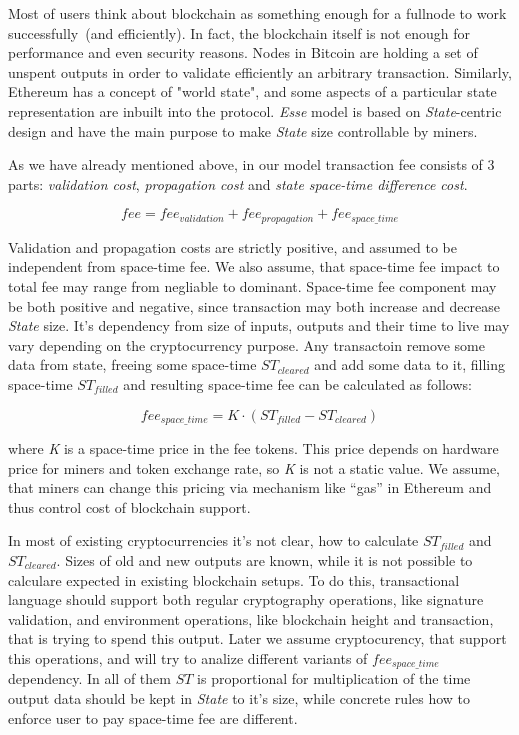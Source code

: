 \documentclass[]{article}   %
\newcommand{\authnote}[2]{\marginpar{\parbox{\marginparwidth}{\tiny %
  \textsf{#1 {\textcolor{blue}{notes: #2}}}}}%
  \textcolor{blue}{\textbf{\dag}}}
\newcommand{\authnote}[2]{
  \textsf{#1 \textcolor{blue}{: #2}}}
\newcommand{\authnote}[2]{}
\newcommand{\dnote}[1]{{\authnote{\textcolor{blue}{Dima notes}}{#1}}}
\newcommand{\esse}{\textit{Esse}}
\newcommand{\state}{\textit{State}}
\begin{document}
Most of users think about blockchain as something enough for a fullnode to work successfully~(and efficiently). In fact, the blockchain itself is not enough for performance and even security reasons. Nodes in Bitcoin are holding a set of unspent outputs in order to validate efficiently an arbitrary transaction. Similarly, Ethereum\cite{ethyp} has a concept of "world state", and some aspects of a particular state representation are inbuilt into the protocol. \esse{} model is based on \state{}-centric design and have the main purpose to make \state{} size controllable by miners.

As we have already mentioned above, in our model transaction fee consists of 3 parts: \textit{validation cost}, \textit{propagation cost} and \textit{state space-time difference cost}.

\begin{equation}
fee = fee_{validation} + fee_{propagation} + fee_{space\_time}
\end{equation}

 \dnote{should we require from total fee to be positive?}

Validation and propagation costs are strictly positive, and assumed to be independent from space-time fee. We also assume, that space-time fee impact to total fee may range from negliable to dominant. Space-time fee component may be both positive and negative, since transaction may both increase and decrease \state{} size. It's dependency from size of inputs, outputs and their time to live may vary depending on the cryptocurrency purpose. Any transactoin remove some data from state, freeing some space-time \textit{$ST_{cleared}$} and add some data to it, filling space-time \textit{$ST_{filled}$} and resulting space-time fee can be calculated as follows:

\begin{equation}
fee_{space\_time} = K \cdot (ST_{filled} - ST_{cleared})
\end{equation}

where \textit{K} is a space-time price in the fee tokens. This price depends on hardware price for miners and token exchange rate, so \textit{K} is not a static value. We assume, that miners can change this pricing via mechanism like ``gas'' in Ethereum and thus control cost of blockchain support.

In most of existing cryptocurrencies it's not clear, how to calculate \textit{$ST_{filled}$} and \textit{$ST_{cleared}$}. Sizes of old and new outputs are known, while it is not possible to calculare expected in existing blockchain setups. To do this, transactional language should support both regular cryptography operations, like signature validation, and environment operations, like blockchain height and transaction, that is trying to spend this output. Later we assume cryptocurency, that support this operations, and will try to analize different variants of \textit{$fee_{space\_time}$} dependency. In all of them \textit{$ST$} is proportional for multiplication of the time output data should be kept in \state{} to it's size, while concrete rules how to enforce user to pay space-time fee are different.
\end{document}
